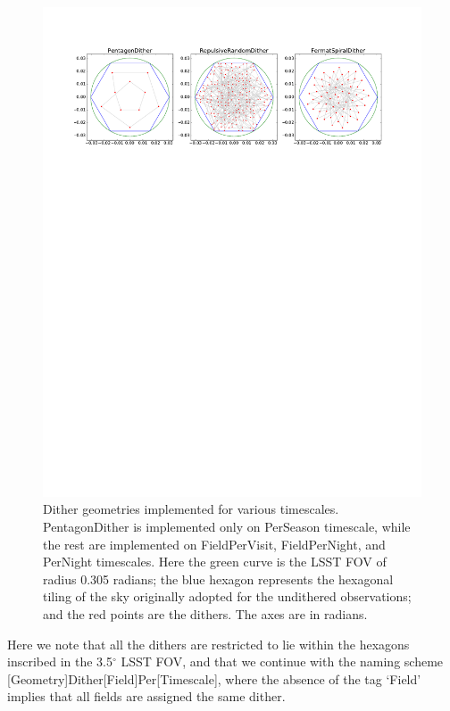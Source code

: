 \begin{figure}[!htb]
      \centering\includegraphics[width=\linewidth, trim={25 570 25 50},clip=true]{figs/awan_dithGeometries.pdf}
\caption{Dither geometries implemented for various timescales. PentagonDither is implemented only on PerSeason timescale, while the rest are implemented on FieldPerVisit, FieldPerNight, and PerNight timescales. Here the green curve is the LSST FOV of radius 0.305 radians; the blue hexagon represents the hexagonal tiling of the sky originally adopted for the undithered observations; and the red points are the dithers. The axes are in radians.}
\label{fig: dithGeometries}
\end{figure}

Here we note that all the dithers are restricted to lie within the hexagons inscribed in the 3.5$^\circ$ LSST FOV, and that we continue with the naming scheme [Geometry]Dither[Field]Per[Timescale], where the absence of the tag `Field' implies that all fields are assigned the same dither.

